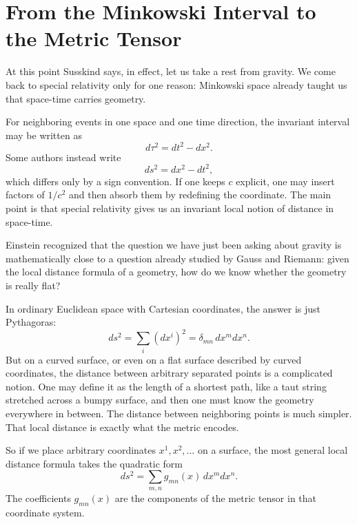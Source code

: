 \section{From the Minkowski Interval to the Metric Tensor}

At this point Susskind says, in effect, let us take a rest from gravity.  We come back to special relativity only for one reason: Minkowski space already taught us that space-time carries geometry.

For neighboring events in one space and one time direction, the invariant interval may be written as
\begin{equation}
d\tau^2 = dt^2 - dx^2.
\end{equation}
Some authors instead write
\begin{equation}
ds^2 = dx^2 - dt^2,
\end{equation}
which differs only by a sign convention.  If one keeps \(c\) explicit, one may insert factors of \(1/c^2\) and then absorb them by redefining the coordinate.  The main point is that special relativity gives us an invariant local notion of distance in space-time.

Einstein recognized that the question we have just been asking about gravity is mathematically close to a question already studied by Gauss and Riemann: given the local distance formula of a geometry, how do we know whether the geometry is really flat?

In ordinary Euclidean space with Cartesian coordinates, the answer is just Pythagoras:
\begin{equation}
ds^2 = \sum_i (dx^i)^2 = \delta_{mn}\,dx^m dx^n.
\end{equation}
But on a curved surface, or even on a flat surface described by curved coordinates, the distance between arbitrary separated points is a complicated notion.  One may define it as the length of a shortest path, like a taut string stretched across a bumpy surface, and then one must know the geometry everywhere in between.  The distance between neighboring points is much simpler.  That local distance is exactly what the metric encodes.

So if we place arbitrary coordinates \(x^1,x^2,\dots\) on a surface, the most general local distance formula takes the quadratic form
\begin{equation}
ds^2 = \sum_{m,n} g_{mn}(x)\,dx^m dx^n.
\end{equation}
The coefficients \(g_{mn}(x)\) are the components of the metric tensor in that coordinate system.

